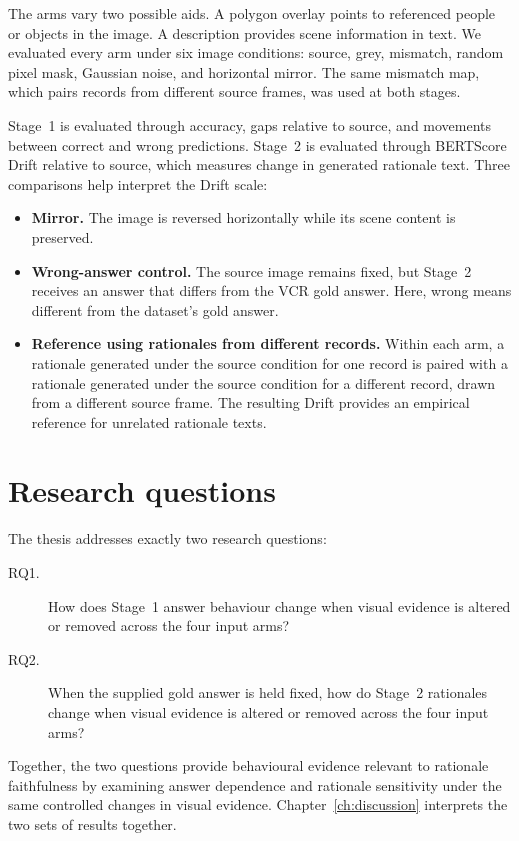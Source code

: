 The arms vary two possible aids. A polygon overlay points to referenced
people or objects in the image. A description provides scene information in
text. We evaluated every arm under six image conditions: source, grey,
mismatch, random pixel mask, Gaussian noise, and horizontal mirror. The same
mismatch map, which pairs records from different source frames, was used at
both stages.

Stage~1 is evaluated through accuracy, gaps relative to source, and movements
between correct and wrong predictions. Stage~2 is evaluated through BERTScore
Drift relative to source, which measures change in generated rationale text.
Three comparisons help interpret the Drift scale:

\begin{itemize}
\item \textbf{Mirror.} The image is reversed horizontally while its scene
content is preserved.
\item \textbf{\mbox{Wrong-answer} control.} The source image remains fixed, but
Stage~2 receives an answer that differs from the VCR gold answer. Here, wrong
means different from the dataset's gold answer.
\item \textbf{Reference using rationales from different records.} Within each
arm, a rationale
generated under the source condition for one record is paired with a rationale
generated under the source condition for a different record, drawn from a
different source frame. The resulting Drift provides an empirical reference for
unrelated rationale texts.
\end{itemize}

\section{Research questions}
\label{sec:intro-rqs}

The thesis addresses exactly two research questions:

\begin{description}
\item[RQ1.] How does Stage~1 answer behaviour change when visual evidence is altered or removed across the four input arms?
\item[RQ2.] When the supplied gold answer is held fixed, how do Stage~2 rationales change when visual evidence is altered or removed across the four input arms?
\end{description}

Together, the two questions provide behavioural evidence relevant to rationale
faithfulness by examining answer dependence and rationale sensitivity under the
same controlled changes in visual evidence. Chapter~\ref{ch:discussion}
interprets the two sets of results together.

